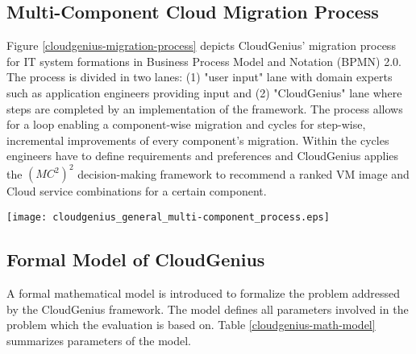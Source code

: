 \documentclass[10pt]{article}
\begin{document}
\subsection{Multi-Component Cloud Migration Process}





Figure \ref{cloudgenius-migration-process} depicts CloudGenius' migration process for IT system formations in Business Process Model and Notation (BPMN) 2.0. The process is divided in two lanes: (1)  "user input" lane with domain experts such as application engineers providing input and (2) "CloudGenius" lane where steps are completed by an implementation of the framework. 
The process allows for a loop enabling a component-wise migration and cycles for step-wise, incremental improvements of every component's migration. Within the cycles engineers have to define requirements and preferences and CloudGenius applies the $(MC^2)^2$ decision-making framework to recommend a ranked VM image and Cloud service combinations for a certain component. 

\begin{sidewaysfigure}[!p]
\centering
\texttt{[image: cloudgenius\_general\_multi-component\_process.eps]} 
\caption{Multi-Component Migration Process of the CloudGenius Framework}\label{cloudgenius-migration-process}
\end{sidewaysfigure}

\subsection{Formal Model of CloudGenius}

A formal mathematical model is introduced to formalize the problem addressed by the CloudGenius framework. The model defines all parameters involved in the problem which the evaluation is based on.
Table \ref{cloudgenius-math-model} summarizes parameters of the model. 
\end{document}
